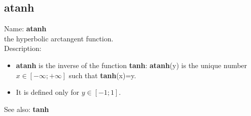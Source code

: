 \subsection{ atanh }
\noindent Name: \textbf{atanh}\\
the hyperbolic arctangent function.\\

\noindent Description: \begin{itemize}

\item \textbf{atanh} is the inverse of the function \textbf{tanh}: \textbf{atanh}(y) is the unique number 
   $x \in [-\infty; +\infty]$ such that \textbf{tanh}(x)=y.

\item It is defined only for $y \in [-1; 1]$.
\end{itemize}
See also: \textbf{tanh}
